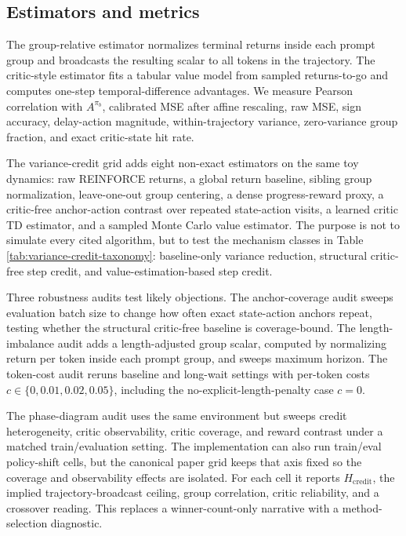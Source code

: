 \documentclass[11pt]{article}
\begin{document}
\subsection{Estimators and metrics}

The group-relative estimator normalizes terminal returns inside each prompt
group and broadcasts the resulting scalar to all tokens in the trajectory. The
critic-style estimator fits a tabular value model from sampled returns-to-go and
computes one-step temporal-difference advantages. We measure Pearson
correlation with $A^{\pi_b}$, calibrated MSE after affine rescaling,
raw MSE, sign accuracy, delay-action magnitude, within-trajectory variance,
zero-variance group fraction, and exact critic-state hit rate.

The variance-credit grid adds eight non-exact estimators on the same toy
dynamics: raw REINFORCE returns, a global return baseline, sibling group
normalization, leave-one-out group centering, a dense progress-reward proxy, a
critic-free anchor-action contrast over repeated state-action visits, a learned
critic TD estimator, and a sampled Monte Carlo value estimator. The purpose is
not to simulate every cited algorithm, but to test the mechanism classes in
Table \ref{tab:variance-credit-taxonomy}: baseline-only variance reduction,
structural critic-free step credit, and value-estimation-based step credit.

Three robustness audits test likely objections. The anchor-coverage audit
sweeps evaluation batch size to change how often exact state-action anchors
repeat, testing whether the structural critic-free baseline is coverage-bound.
The length-imbalance audit adds a length-adjusted group scalar, computed by
normalizing return per token inside each prompt group, and sweeps maximum
horizon. The token-cost audit reruns baseline and long-wait settings with
per-token costs $c \in \{0, 0.01, 0.02, 0.05\}$, including the
no-explicit-length-penalty case $c=0$.

The phase-diagram audit uses the same environment but sweeps
credit heterogeneity, critic observability, critic coverage, and reward
contrast under a matched train/evaluation setting. The implementation can also
run train/eval policy-shift cells, but the canonical paper grid keeps that axis
fixed so the coverage and observability effects are isolated. For each cell it
reports $H_{\mathrm{credit}}$, the implied
trajectory-broadcast ceiling, group correlation, critic reliability, and a
crossover reading. This replaces a winner-count-only narrative with a
method-selection diagnostic.
\end{document}
